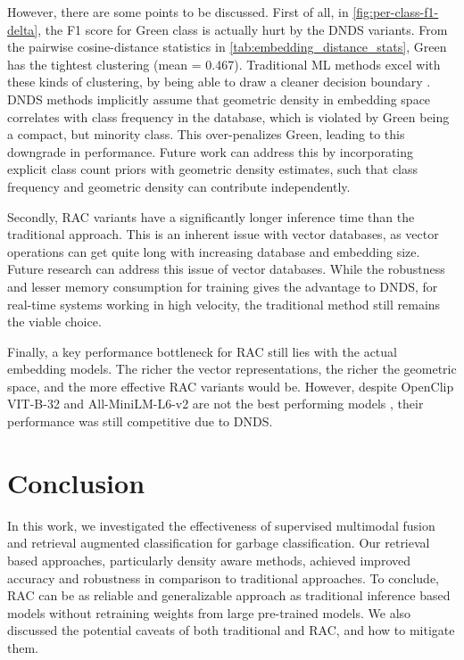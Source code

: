 \documentclass{article}
\begin{document}
However, there are some points to be discussed. First of all, in \autoref{fig:per-class-f1-delta}, the F1 score for Green class is actually hurt by the DNDS variants. From the pairwise cosine-distance statistics in \autoref{tab:embedding_distance_stats}, Green has the tightest clustering (mean = 0.467). Traditional ML methods excel with these kinds of clustering, by being able to draw a cleaner decision boundary \cite{yan2009studies}. DNDS methods implicitly assume that geometric density in embedding space correlates with class frequency in the database, which is violated by Green being a compact, but minority class. This over-penalizes Green, leading to this downgrade in performance. Future work can address this by incorporating explicit class count priors with geometric density estimates, such that class frequency and geometric density can contribute independently.

Secondly, RAC variants have a significantly longer inference time than the traditional approach. This is an inherent issue with vector databases, as vector operations can get quite long with increasing database and embedding size. Future research can address this issue of vector databases. While the robustness and lesser memory consumption for training gives the advantage to DNDS, for real-time systems working in high velocity, the traditional method still remains the viable choice. 

Finally, a key performance bottleneck for RAC still lies with the actual embedding models. The richer the vector representations, the richer the geometric space, and the more effective RAC variants would be. However, despite OpenClip VIT-B-32 and All-MiniLM-L6-v2 are not the best performing models \cite{abimbola2026open, islam2026learning, li2025iris}, their performance was still competitive due to DNDS. 

\section{Conclusion}
\label{sec:conclusion}

In this work, we investigated the effectiveness of supervised multimodal fusion and retrieval augmented classification for garbage classification. Our retrieval based approaches, particularly density aware methods, achieved improved accuracy and robustness in comparison to traditional approaches. To conclude, RAC can be as reliable and generalizable approach as traditional inference based models without retraining weights from large pre-trained models. We also discussed the potential caveats of both traditional and RAC, and how to mitigate them.
\end{document}

